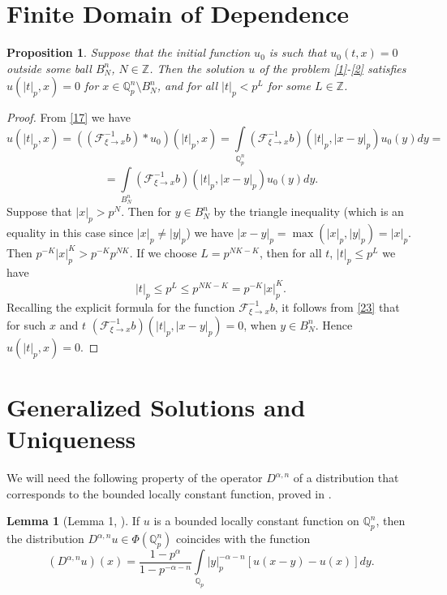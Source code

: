 \documentclass[14pt]{article}
\theoremstyle{theorem}
\theoremstyle{theorem}
\newtheorem{proposition}{Proposition}[section]
\theoremstyle{definition}
\theoremstyle{lemma}
\newtheorem{lemma}{Lemma}[section]
\newcommand{\Label}[1]{\label{#1}}
\numberwithin{equation}{section}
\begin{document}
\section{Finite Domain of Dependence}

\begin{proposition}\Label{prH}
Suppose that the initial function $u_0$ is such that $u_0(t,x)=0$ outside some ball $B_N^n$, $N\in\mathbb{Z}$. Then the solution $u$ of the problem \eqref{1}-\eqref{2} satisfies $u(|t|_p,x)=0$ for $x\in\mathbb{Q}_p^n\setminus B_N^n$, and for all $|t|_p<p^L$ for some $L\in\mathbb{Z}$.
\end{proposition}

\begin{proof}
From \eqref{17} we have
$$u(|t|_p,x)=\left((\mathcal{F}_{\xi\to x}^{-1}b)\ast u_0\right)(|t|_p,x)=\int\limits_{\mathbb{Q}_p^n}(\mathcal{F}_{\xi\to x}^{-1}b)(|t|_p,|x-y|_p)u_0(y)dy=$$
$$=\int\limits_{B_N^n}(\mathcal{F}_{\xi\to x}^{-1}b)(|t|_p,|x-y|_p)u_0(y)dy.$$
Suppose that $|x|_p>p^N$. Then for $y\in B_N^n$ by the triangle inequality (which is an equality in this case since $|x|_p\neq|y|_p$) we have $|x-y|_p=\max(|x|_p,|y|_p)=|x|_p$. Then $p^{-K}|x|_p^K>p^{-K}p^{NK}$. If we choose $L=p^{NK-K}$, then for all $t$, $|t|_p\leq p^L$ we have
$$|t|_p\leq p^L\leq p^{NK-K}=p^{-K}|x|_p^K.$$
Recalling the explicit formula for the function $\mathcal{F}_{\xi\to x}^{-1}b$, it follows from \eqref{23} that for such $x$ and $t$ $(\mathcal{F}_{\xi\to x}^{-1}b)(|t|_p,|x-y|_p)=0$, when $y\in B_N^n$. Hence $u(|t|_p,x)=0$.

\end{proof}

\section{Generalized Solutions and Uniqueness}

We will need the following property of the operator $D^{\alpha,n}$ of a distribution that corresponds to the bounded locally constant function, proved in \cite{K2008}.

\begin{lemma}[Lemma 1, \cite{K2008}]\Label{lemma2}
If $u$ is a bounded locally constant function on $\mathbb{Q}_p^n$, then the distribution $D^{\alpha,n}u\in\Phi(\mathbb{Q}_p^n)$ coincides with the function
\begin{equation}\Label{34}
(D^{\alpha,n}u)(x)=\dfrac{1-p^{\alpha}}{1-p^{-\alpha-n}}\int\limits_{\mathbb{Q}_p}|y|_p^{-\alpha-n}\left[u(x-y)-u(x)\right]dy.
\end{equation}
\end{lemma}
\end{document}
